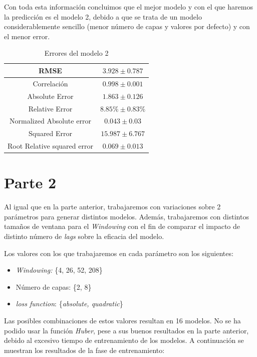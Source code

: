 \documentclass[12pt]{report} %
\begin{document}
    Con toda esta información concluimos que el mejor modelo y con el que haremos la predicción es el modelo 2, debido a que se trata de un modelo considerablemente sencillo (menor número de capas y valores por defecto) y con el menor error.

\begin{table}[H]
\begin{center}
\begin{tabular}{|c|c|}
    \hline
    RMSE & $3.928\pm0.787$\\ 
    \hline
    Correlación & $0.998\pm 0.001$\\
    \hline
    Absolute Error & $1.863\pm0.126$\\
    \hline
    Relative Error & $8.85\%\pm 0.83\%$\\
    \hline
    Normalized Absolute error & $0.043\pm0.03$\\
    \hline
    Squared Error & $15.987\pm 6.767$\\ 
    \hline
    Root Relative squared error & $0.069 \pm 0.013$\\
    \hline
\end{tabular}
\caption{Errores del modelo 2}
\end{center}
\end{table}
	
    \section{Parte 2}
    Al igual que en la parte anterior, trabajaremos con variaciones sobre 2 parámetros para generar distintos modelos. Además, trabajaremos con distintos tamaños de ventana para el \textit{Windowing} con el fin de comparar el impacto de distinto número de \textit{lags} sobre la eficacia del modelo.
    
    Los valores con los que trabajaremos en cada parámetro son los siguientes:
    \begin{itemize}
        \item \textit{Windowing:} \{4, 26, 52, 208\}
        \item Número de capas: \{2, 8\}
        \item \textit{loss function}: \{\textit{absolute, quadratic}\}
    \end{itemize}

    Las posibles combinaciones de estos valores resultan en 16 modelos. No se ha podido usar la función \textit{Huber}, pese a sus buenos resultados en la parte anterior, debido al excesivo tiempo de entrenamiento de los modelos. A continuación se muestran los resultados de la fase de entrenamiento:
\end{document}
